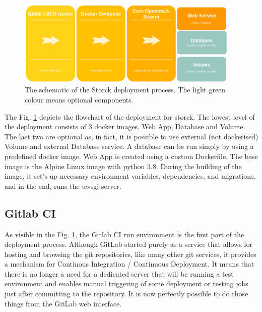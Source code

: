 \begin{figure}[H]
\centering
\includegraphics[width=0.95\textwidth]{figures/chapter5/storck/storck_dockers.drawio.png}
\caption{The schematic of the Storck deployment process. The light green colour means optional components.}
\label{fig:storck-dockers}
\end{figure}

The Fig. \ref{fig:storck-dockers} depicts the flowchart of the deployment for storck.
The lowest level of the deployment consists of 3 docker images, Web App, Database and Volume.
The last two are optional as, in fact, it is possible to use external (not dockerised) Volume and external Database service.
A database can be run simply by using a predefined docker image.
Web App is created using a custom Dockerfile.
The base image is the Alpine Linux image with python 3.8.
During the building of the image, it set's up necessary environment variables, dependencies, and migrations, and in the end, runs the uwsgi server.

\subsection{Gitlab CI}

As visible in the Fig. \ref{fig:storck-dockers}, the Gitlab CI run environment is the first part of the deployment process.
Although GitLab started purely as a service that allows for hosting and browsing the git repositories, like many other git services, it provides a mechanism for Continous Integration / Continuous Deployment.
It means that there is no longer a need for a dedicated server that will be running a test environment and enables manual triggering of some deployment or testing jobs just after committing to the repository.
It is now perfectly possible to do those things from the GitLab web interface.

